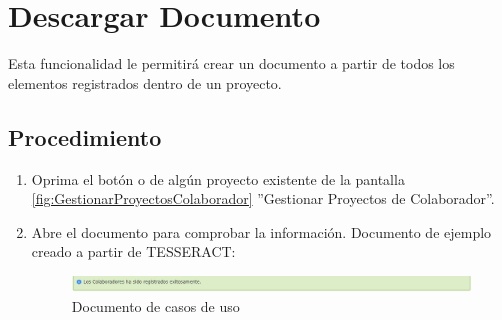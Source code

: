\hypertarget{cv:DescargarDocumento}{\section{Descargar Documento}} \label{sec:descargarDocumento}

		Esta funcionalidad le permitirá crear un documento a partir de todos los elementos registrados dentro de un proyecto.

\subsection{Procedimiento}

\begin{enumerate}
	
	\item Oprima el botón \IUPdf{} o \IUWord de algún proyecto existente de la pantalla \ref{fig:GestionarProyectosColaborador} ''Gestionar Proyectos de Colaborador''.
	
	\item Abre el documento para comprobar la información. Documento de ejemplo creado a partir de TESSERACT:
	
	\begin{figure}[htbp!]
		\begin{center}
			\includegraphics[scale=0.6]{roles/lider/proyectosColaborador/pantallas/IU4-1MSG1}
			\caption{Documento de casos de uso}
			\label{fig:DocumentoFinal}
		\end{center}
	\end{figure}
\end{enumerate}